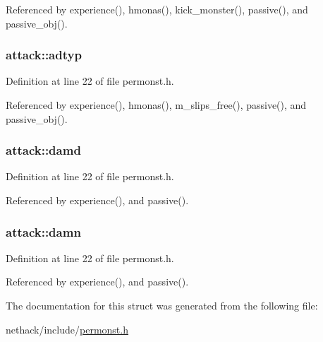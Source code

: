 Referenced by experience(), hmonas(), kick\+\_\+monster(), passive(), and passive\+\_\+obj().

\hypertarget{structattack_a14286742d9dc1310f5c4852432264080}{
\subsubsection[{adtyp}]{ attack\+::adtyp}}\label{structattack_a14286742d9dc1310f5c4852432264080}


Definition at line 22 of file permonst.\+h.



Referenced by experience(), hmonas(), m\+\_\+slips\+\_\+free(), passive(), and passive\+\_\+obj().

\hypertarget{structattack_ac2b210543d1c0d0db89106b7d5f9ee00}{
\subsubsection[{damd}]{ attack\+::damd}}\label{structattack_ac2b210543d1c0d0db89106b7d5f9ee00}


Definition at line 22 of file permonst.\+h.



Referenced by experience(), and passive().

\hypertarget{structattack_abf8c529d3dc814dcbe98780aaa9a9194}{
\subsubsection[{damn}]{ attack\+::damn}}\label{structattack_abf8c529d3dc814dcbe98780aaa9a9194}


Definition at line 22 of file permonst.\+h.



Referenced by experience(), and passive().



The documentation for this struct was generated from the following file\+:\begin{DoxyCompactItemize}
\item 
nethack/include/\hyperlink{permonst_8h}{permonst.\+h}\end{DoxyCompactItemize}
